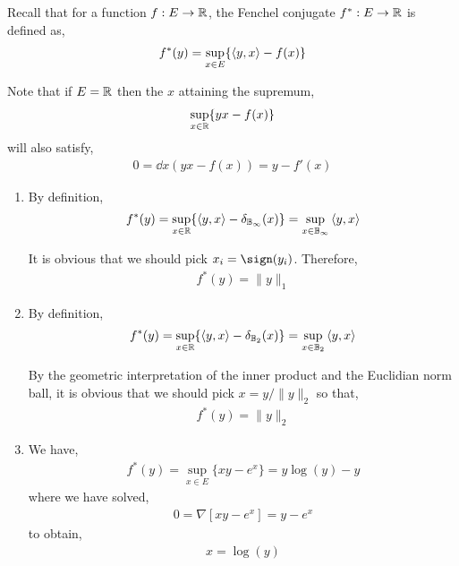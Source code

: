 \documentclass[10pt]{article}
\begin{document}
\begin{solution}[Solution]
Recall that for a function \( f:E\to\mathbb{R} \), the Fenchel conjugate \( f^*:E\to\mathbb{R} \) is defined as,
\begin{align*}
    f^*(y) = \sup_{x\in E}\{ \left\langle y,x \right\rangle - f(x)\}
\end{align*}

Note that if \( E=\mathbb{R} \) then the \( x \) attaining the supremum,
\begin{align*}
    \sup_{x\in \mathbb{R}} \{ yx - f(x) \}
\end{align*}
will also satisfy,
\begin{align*}
    0 = \dd{}{x} \left( yx - f(x) \right)
     = y - f'(x) 
\end{align*}

\begin{enumerate}[label=(\alph*)]
    \item 
        By definition,
        \begin{align*}
            f^*(y) = \sup_{x\in\mathbb{R}} \{ \left\langle y,x \right\rangle - \delta_{\mathbb{B}_{\infty}}(x) \}
            = \sup_{x\in\mathbb{B}_{\infty}} \left\langle y,x \right\rangle 
        \end{align*}

        It is obvious that we should pick \( x_i = \sign(y_i) \). Therefore,
        \begin{align*}
            f^*(y) = \| y \|_1
        \end{align*}
        
        
    \item By definition,
        \begin{align*}
            f^*(y) = \sup_{x\in\mathbb{R}} \{ \left\langle y,x \right\rangle - \delta_{\mathbb{B}_2}(x) \}
            = \sup_{x\in\mathbb{B}_2} \left\langle y,x \right\rangle
        \end{align*}
        
        By the geometric interpretation of the inner product and the Euclidian norm ball, it is obvious that we should pick \( x = y/\| y \|_2 \) so that,
        \begin{align*}
            f^*(y) = \| y \|_2
        \end{align*}
        

    \item We have,
        \begin{align*}
            f^*(y) = \sup_{x\in E}\{xy - e^x\}
            = y \log(y) - y
        \end{align*}
        where we have solved,
        \begin{align*}
            0 = \nabla \left[ xy - e^x \right]
            = y - e^{x}
        \end{align*}
        to obtain,
        \begin{align*}
            x = \log(y)
        \end{align*}
        

\end{enumerate}
\end{solution}
\end{document}
